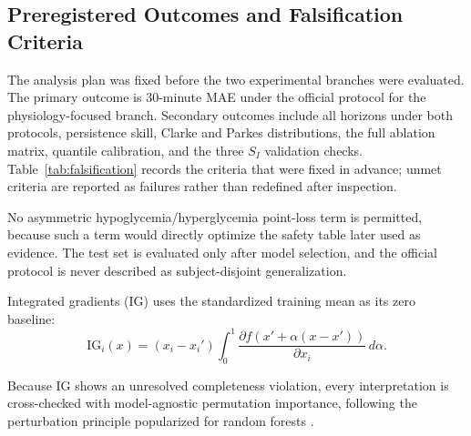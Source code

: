 \documentclass[journal]{IEEEtran}
\begin{document}
\subsection{Preregistered Outcomes and Falsification Criteria}

The analysis plan was fixed before the two experimental branches were evaluated. The primary outcome is 30-minute MAE under the official protocol for the physiology-focused branch. Secondary outcomes include all horizons under both protocols, persistence skill, Clarke and Parkes distributions, the full ablation matrix, quantile calibration, and the three $S_I$ validation checks. Table~\ref{tab:falsification} records the criteria that were fixed in advance; unmet criteria are reported as failures rather than redefined after inspection.

No asymmetric hypoglycemia/hyperglycemia point-loss term is permitted, because such a term would directly optimize the safety table later used as evidence. The test set is evaluated only after model selection, and the official protocol is never described as subject-disjoint generalization.

Integrated gradients (IG) \cite{ref54} uses the standardized training mean as its zero baseline:
\begin{equation}
\text{IG}_i(x) = (x_i - x_i') \int_0^1 \frac{\partial f(x' + \alpha(x - x'))}{\partial x_i}\, d\alpha.
\label{eq:18}
\end{equation}

Because IG shows an unresolved completeness violation, every interpretation is cross-checked with model-agnostic permutation importance, following the perturbation principle popularized for random forests \cite{ref55}.
\end{document}
